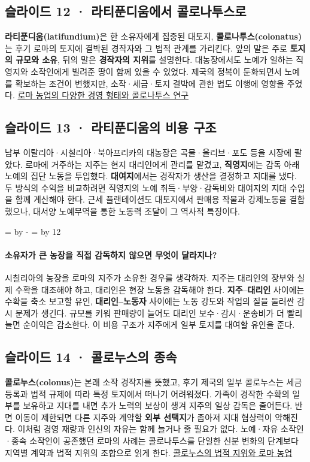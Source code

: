 \documentclass[10pt,a4paper]{article}
\newcommand{\ReserveQuestionSpace}{%
  \par\begingroup
  \dimen0=\pagegoal \advance\dimen0 by -\pagetotal
  \dimen2=\baselineskip \multiply\dimen2 by 12
  \ifdim\dimen0<\dimen2 \newpage\fi
  \endgroup}
\begin{document}
\subsection{슬라이드 12 · 라티푼디움에서 콜로나투스로}
\textbf{라티푼디움(latifundium)}은 한 소유자에게 집중된 대토지, \textbf{콜로나투스(colonatus)}는 후기 로마의 토지에 결박된 경작자와 그 법적 관계를 가리킨다. 앞의 말은 주로 \textbf{토지의 규모와 소유}, 뒤의 말은 \textbf{경작자의 지위}를 설명한다. 대농장에서도 노예가 일하는 직영지와 소작인에게 빌려준 땅이 함께 있을 수 있었다. 제국의 정복이 둔화되면서 노예를 확보하는 조건이 변했지만, 소작·세금·토지 결박에 관한 법도 이행에 영향을 주었다. \href{https://assets.cambridge.org/97810091/72608/excerpt/9781009172608\_excerpt.pdf}{로마 농업의 다양한 경영 형태와 콜로나투스 연구}\par

\subsection{슬라이드 13 · 라티푼디움의 비용 구조}
남부 이탈리아·시칠리아·북아프리카의 대농장은 곡물·올리브·포도 등을 시장에 팔았다. 로마에 거주하는 지주는 현지 대리인에게 관리를 맡겼고, \textbf{직영지}에는 감독 아래 노예의 집단 노동을 투입했다. \textbf{대여지}에서는 경작자가 생산을 결정하고 지대를 냈다. 두 방식의 수익을 비교하려면 직영지의 노예 취득·부양·감독비와 대여지의 지대 수입을 함께 계산해야 한다. 근세 플랜테이션도 대토지에서 판매용 작물과 강제노동을 결합했으나, 대서양 노예무역을 통한 노동력 조달이 그 역사적 특징이다.\par

\ReserveQuestionSpace
\paragraph{소유자가 큰 농장을 직접 감독하지 않으면 무엇이 달라지나?}

시칠리아의 농장을 로마의 지주가 소유한 경우를 생각하자. 지주는 대리인의 장부와 실제 수확을 대조해야 하고, 대리인은 현장 노동을 감독해야 한다. \textbf{지주–대리인} 사이에는 수확을 축소 보고할 유인, \textbf{대리인–노동자} 사이에는 노동 강도와 작업의 질을 둘러싼 감시 문제가 생긴다. 규모를 키워 판매량이 늘어도 대리인 보수·감시·운송비가 더 빨리 늘면 순이익은 감소한다. 이 비용 구조가 지주에게 일부 토지를 대여할 유인을 준다.\par

\subsection{슬라이드 14 · 콜로누스의 종속}
\textbf{콜로누스(colonus)}는 본래 소작 경작자를 뜻했고, 후기 제국의 일부 콜로누스는 세금 등록과 법적 규제에 따라 특정 토지에서 떠나기 어려워졌다. 가족이 경작한 수확의 일부를 보유하고 지대를 내면 추가 노력의 보상이 생겨 지주의 일상 감독은 줄어든다. 반면 이동이 제한되면 다른 지주와 계약할 \textbf{외부 선택지}가 좁아져 지대 협상력이 약해진다. 이처럼 경영 재량과 인신의 자유는 함께 늘거나 줄 필요가 없다. 노예·자유 소작인·종속 소작인이 공존했던 로마의 사례는 콜로나투스를 단일한 신분 변화의 단계보다 지역별 계약과 법적 지위의 조합으로 읽게 한다. \href{https://assets.cambridge.org/97810091/72608/excerpt/9781009172608\_excerpt.pdf}{콜로누스의 법적 지위와 로마 농업}\par
\end{document}
